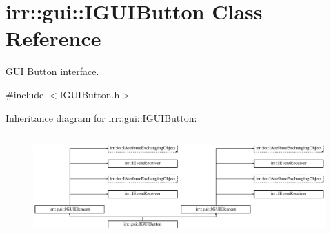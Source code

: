 \hypertarget{classirr_1_1gui_1_1IGUIButton}{}\section{irr\+:\+:gui\+:\+:I\+G\+U\+I\+Button Class Reference}
\label{classirr_1_1gui_1_1IGUIButton}


G\+UI \hyperlink{classButton}{Button} interface.  




{\ttfamily \#include $<$I\+G\+U\+I\+Button.\+h$>$}

Inheritance diagram for irr\+:\+:gui\+:\+:I\+G\+U\+I\+Button\+:\begin{figure}[H]
\begin{center}
\leavevmode
\includegraphics[height=4.038462cm]{classirr_1_1gui_1_1IGUIButton}
\end{center}
\end{figure}
